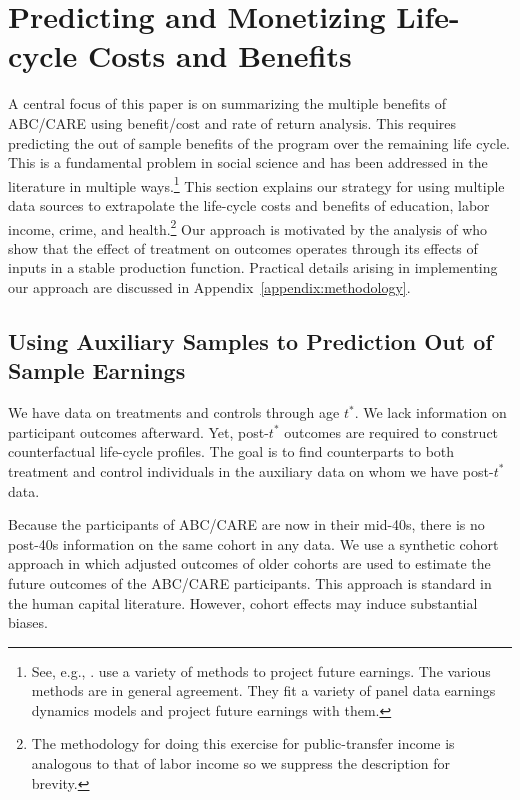 \section{Predicting and Monetizing Life-cycle Costs and Benefits}\label{section:cbamethodology}

A central focus of this paper is on summarizing the multiple benefits of ABC/CARE using benefit/cost and rate of return analysis. This requires predicting the out of sample benefits of the program over the remaining life cycle. This is a fundamental problem in social science and has been addressed in the literature in multiple ways.\footnote{See, e.g., \cite{Heckman_Lochner_ea_2006_HEE}. \citet{Heckman_Moon_etal_2010_RateofReturn} use a variety of methods to project future earnings. The various methods are in general agreement. They fit a variety of panel data earnings dynamics models and project future earnings with them.} This section explains our strategy for using multiple data sources to extrapolate the life-cycle costs and benefits of education, labor income, crime, and health.\footnote{The methodology for doing this exercise for public-transfer income is analogous to that of labor income so we suppress the description for brevity.} Our approach is motivated by the analysis of \citet{Heckman_Pinto_etal_2013_PerryFactor} who show that the effect of treatment on outcomes operates through its effects of inputs in a stable production function. Practical details arising in implementing our approach are discussed in Appendix~\ref{appendix:methodology}.

\subsection{Using Auxiliary Samples to Prediction Out of Sample Earnings}\label{sec:necrosis}

We have data on treatments and controls through age $t^{\ast}$. We lack information on participant outcomes afterward. Yet, post-$t^{\ast}$ outcomes are required to construct counterfactual life-cycle profiles. The goal is to find counterparts to both treatment and control individuals in the auxiliary data on whom we have post-$t^{\ast}$ data.

Because the participants of ABC/CARE are now in their mid-40s, there is no post-40s information on the same cohort  in any data. We use a synthetic cohort approach in which adjusted outcomes of older cohorts are used to estimate the future outcomes of the ABC/CARE participants. This approach is standard in the human capital literature. However, cohort effects may induce substantial biases.

